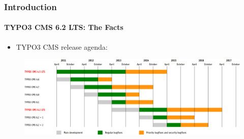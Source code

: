 \begin{frame}[fragile]
	\frametitle{Introduction}
	\framesubtitle{TYPO3 CMS 6.2 LTS: The Facts}

	\begin{itemize}
		\item TYPO3 CMS release agenda:
	\end{itemize}

	\begin{figure}
		\includegraphics[width=0.99\linewidth]{Images/Introduction/ReleaseAgenda.png}
	\end{figure}

\end{frame}


